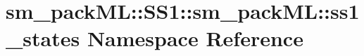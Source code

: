 \hypertarget{namespacesm__packML_1_1SS1_1_1sm__packML_1_1ss1__states}{}\section{sm\+\_\+pack\+ML\+:\+:S\+S1\+:\+:sm\+\_\+pack\+ML\+:\+:ss1\+\_\+states Namespace Reference}
\label{namespacesm__packML_1_1SS1_1_1sm__packML_1_1ss1__states}
